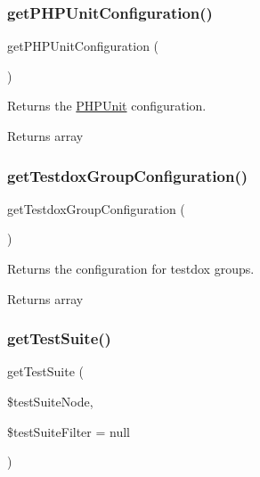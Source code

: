 \subsubsection{\texorpdfstring{get\+P\+H\+P\+Unit\+Configuration()}{getPHPUnitConfiguration()}}
{\footnotesize\ttfamily get\+P\+H\+P\+Unit\+Configuration (\begin{DoxyParamCaption}{ }\end{DoxyParamCaption})}

Returns the \mbox{\hyperlink{namespace_p_h_p_unit}{P\+H\+P\+Unit}} configuration.

\begin{DoxyReturn}{Returns}
array 
\end{DoxyReturn}
\mbox{\label{class_p_h_p_unit___util___configuration_af48b04caca08477e6a3128b3712fb562}} 
\subsubsection{\texorpdfstring{get\+Testdox\+Group\+Configuration()}{getTestdoxGroupConfiguration()}}
{\footnotesize\ttfamily get\+Testdox\+Group\+Configuration (\begin{DoxyParamCaption}{ }\end{DoxyParamCaption})}

Returns the configuration for testdox groups.

\begin{DoxyReturn}{Returns}
array 
\end{DoxyReturn}
\mbox{\label{class_p_h_p_unit___util___configuration_a07e38c4b4f08f2d50739562235952225}} 
\subsubsection{\texorpdfstring{get\+Test\+Suite()}{getTestSuite()}}
{\footnotesize\ttfamily get\+Test\+Suite (\begin{DoxyParamCaption}\item[{D\+O\+M\+Element}]{\$test\+Suite\+Node,  }\item[{}]{\$test\+Suite\+Filter = {\ttfamily null} }\end{DoxyParamCaption})\hspace{0.3cm}{\ttfamily [protected]}}


